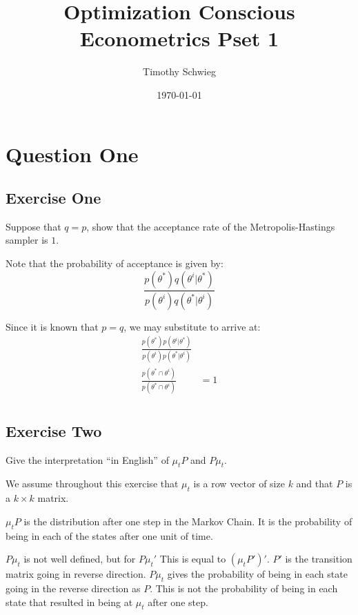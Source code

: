 \documentclass[12pt]{paper}
\author{Timothy Schwieg}
\date{\today}
\title{Optimization Conscious Econometrics Pset 1}
\begin{document}
\maketitle

\section{Question One}
\label{sec:org0b5fbc5}

\subsection{Exercise One}
\label{sec:orgf0b1dad}

Suppose that \(q = p\), show that the acceptance rate of the
Metropolis-Hastings sampler is \(1\).

\vspace{.3in}

Note that the probability of acceptance is given by:
\begin{equation*}
  \frac{p(\theta^{*}) q( \theta^i \vert \theta^{*})}{p(\theta^i) q( \theta^{*} \vert \theta^i)}
\end{equation*}


Since it is known that $p = q$, we may substitute to arrive at:
\begin{align*}
  \frac{p(\theta^{*}) p( \theta^i \vert \theta^{*})}{ p(\theta^i) p( \theta^{*} \vert \theta^i)} &\\
  \frac{p(\theta^{*} \cap \theta^i)}{p( \theta^{*} \cap \theta^i)} &= 1\\
\end{align*}

\subsection{Exercise Two}
\label{sec:org33f5cb9}



Give the interpretation ``in English'' of $\mu_t P$ and $P \mu_t$.

\vspace{.3in}

We assume throughout this exercise that $\mu_t$ is a row vector of size
$k$ and that $P$ is a $k \times k$ matrix.

$\mu_t P$ is the distribution after one step in the Markov Chain. It is
the probability of being in each of the states after one unit of
time.

$P \mu_t$ is not well defined, but for $P \mu_t'$ This is equal to
$\left( \mu_t P' \right)'$. $P'$ is the transition matrix going in
reverse direction. $P \mu_t$ gives the probability of being in each
state going in the reverse direction as $P$. This is not the
probability of being in each state that resulted in being at $\mu_t$
after one step.
\end{document}
